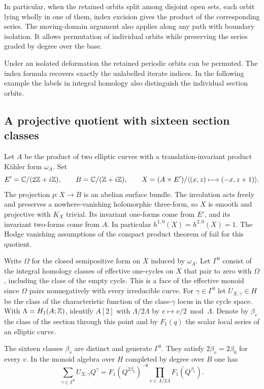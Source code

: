 In particular, when the retained orbits split among disjoint open
sets, each orbit lying wholly in one of them, index excision gives
the product of the corresponding series. The moving-domain argument
also applies along any path with boundary isolation. It allows
permutation of individual orbits while preserving the series
graded by degree over the base.


Under an isolated deformation the retained periodic orbits can be
permuted. The index formula recovers exactly the unlabelled iterate
indices. In the following example the labels in integral homology
also distinguish the individual section orbits.

\subsection{A projective quotient with sixteen section classes}\label{sec:compact}

Let $A$ be the product of two elliptic curves with a translation-invariant
product K\"ahler form $\omega_A$. Set
\[
 E'=\mathbb C/(2\mathbb Z+i\mathbb Z),\qquad B=\mathbb C/(\mathbb Z+i\mathbb Z),\qquad
 X=(A\times E')/\langle (x,z)\longmapsto(-x,z+1)\rangle .
\]
The projection $p:X\to B$ is an abelian surface bundle. The involution
acts freely and preserves a nowhere-vanishing holomorphic three-form,
so $X$ is smooth and projective with $K_X$ trivial. Its invariant
one-forms come from $E'$, and its invariant two-forms come from $A$.
In particular $h^{1,0}(X)=h^{2,0}(X)=1$. The Hodge vanishing assumptions
of the compact product theorem of \cite{WueProduct} fail for this quotient.

Write $\Omega$ for the closed semipositive form on $X$ induced by
$\omega_A$. Let $\Gamma^0$ consist of the integral homology classes
of effective one-cycles on $X$ that pair to zero with $\Omega$,
including the class of the empty cycle. This is a face of the effective
monoid since $\Omega$ pairs nonnegatively with every irreducible curve.
For $\gamma\in\Gamma^0$ let $U_{X,\gamma}\in H$ be the class of
the characteristic function of the class-$\gamma$ locus in the cycle
space. With $\Lambda=H_1(A;\mathbb Z)$, identify $A[2]$ with
$\Lambda/2\Lambda$ by $v\mapsto v/2\bmod\Lambda$. Denote by
$\beta_v$ the class of the section through this point and by
$F_1(q)$ the scalar local series of an elliptic curve.

\begin{theorem}\label{thm:face}
The sixteen classes $\beta_v$ are distinct and generate $\Gamma^0$.
They satisfy $2\beta_v=2\beta_0$ for every $v$. In the monoid
algebra over $H$ completed by degree over $B$ one has
\begin{equation}\label{eq:face}
  \sum_{\gamma\in\Gamma^0}U_{X,\gamma}Q^\gamma
       =F_1(Q^{2\beta_0})^{-8}
          \prod_{v\in\Lambda/2\Lambda}F_1(Q^{\beta_v}).
\end{equation}
\end{theorem}

